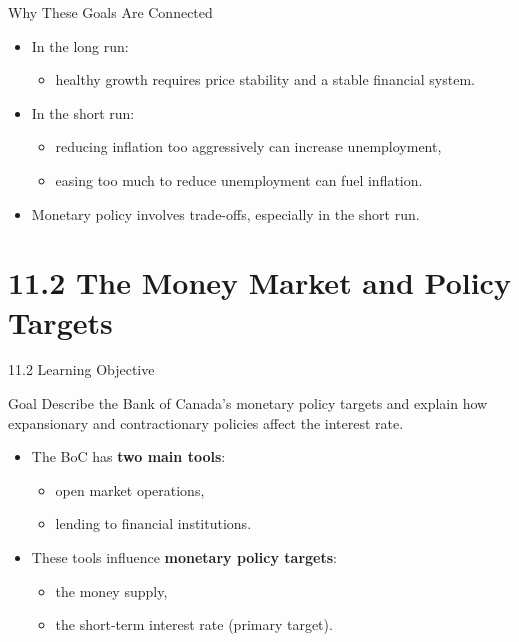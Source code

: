 \documentclass[aspectratio=169]{beamer}
\begin{document}
\begin{frame}{Why These Goals Are Connected}
\transfade
\begin{itemize}[<+->]
  \item In the long run:
  \begin{itemize}[<+->]
    \item healthy growth requires price stability and a stable financial system.
  \end{itemize}
  \item In the short run:
  \begin{itemize}[<+->]
    \item reducing inflation too aggressively can increase unemployment,
    \item easing too much to reduce unemployment can fuel inflation.
  \end{itemize}
  \item Monetary policy involves \alert{trade-offs}, especially in the short run.
\end{itemize}
\end{frame}

\section{11.2 The Money Market and Policy Targets}

\begin{frame}{11.2 Learning Objective}
\transfade
\begin{block}{Goal}
Describe the Bank of Canada’s monetary policy targets and explain how expansionary and contractionary policies affect the interest rate.
\end{block}
\begin{itemize}[<+->]
  \item The BoC has \textbf{two main tools}:
  \begin{itemize}[<+->]
    \item open market operations,
    \item lending to financial institutions.
  \end{itemize}
  \item These tools influence \textbf{monetary policy targets}:
  \begin{itemize}[<+->]
    \item the money supply,
    \item the short-term interest rate (primary target).
  \end{itemize}
\end{itemize}
\end{frame}
\end{document}
